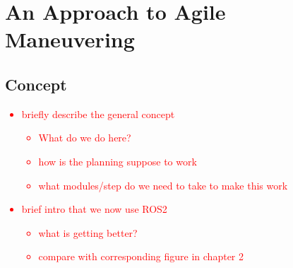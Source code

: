 
\chapter{An Approach to Agile Maneuvering}
\label{sec:approach-to-agile-maneuvering}

\section{Concept}
\textcolor{red}{
\begin{itemize}
    \item briefly describe the general concept
    \begin{itemize}
        \item What do we do here?
        \item how is the planning suppose to work
        \item what modules/step do we need to take to make this work
    \end{itemize} 
    \item brief intro that we now use ROS2
    \begin{itemize}
        \item what is getting better?
        \item compare with corresponding figure in chapter 2
    \end{itemize}
\end{itemize}}


